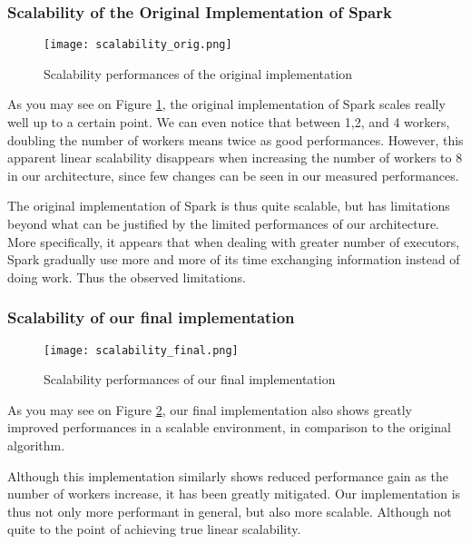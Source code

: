 \documentclass{eplmastersthesis}
\begin{document}
\subsubsection{Scalability of the Original Implementation of Spark}

\begin{figure}[h]
  \centering
  \texttt{[image: scalability\_orig.png]}
  \caption{Scalability performances of the original implementation}
  \label{fig:scal_orig}
\end{figure}

As you may see on Figure \ref{fig:scal_orig}, the original implementation of Spark scales really well up to a certain point. We can even notice that between 1,2, and 4 workers, doubling the number of workers means twice as good performances. However, this apparent linear scalability disappears when increasing the number of workers to 8 in our architecture, since few changes can be seen in our measured performances. \newline

The original implementation of Spark is thus quite scalable, but has limitations beyond what can be justified by the limited performances of our architecture. More specifically, it appears that when dealing with greater number of executors, Spark gradually use more and more of its time exchanging information instead of doing work. Thus the observed limitations. \newline

\subsubsection{Scalability of our final implementation}

\begin{figure}[h]
  \centering
  \texttt{[image: scalability\_final.png]}
  \caption{Scalability performances of our final implementation}
  \label{fig:scal_final}
\end{figure}

As you may see on Figure \ref{fig:scal_final}, our final implementation also shows greatly improved performances in a scalable environment, in comparison to the original algorithm. \newline

Although this implementation similarly shows reduced performance gain as the number of workers increase, it has been greatly mitigated. Our implementation is thus not only more performant in general, but also more scalable. Although not quite to the point of achieving true linear scalability. \newline
\end{document}
